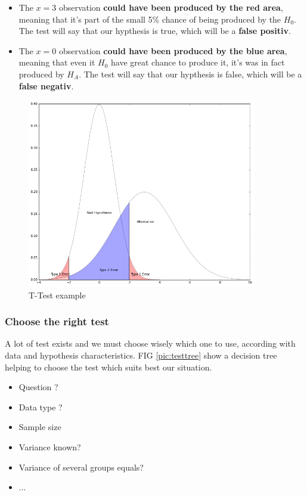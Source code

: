 \documentclass[a4paper,11pt,twoside]{article}
\begin{document}
\begin{itemize}
	\item The $x=3$ observation \textbf{could have been produced by the red area}, meaning that it's part of the small 5\% chance of being produced by the $H_0$. The test will say that our hypthesis is true, which will be a \textbf{false positiv}.

	\item The $x=0$ observation \textbf{could have been produced by the blue area}, meaning that even it $H_0$ have great chance to produce it, it's was in fact produced by $H_A$.  The test will say that our hypthesis is false, which will be a \textbf{false negativ}.
\end{itemize}

\begin{figure}[h]%
 \centering
 \includegraphics[width=10cm]{./pic/t-test}
 \caption{\label{pic:ttest} T-Test example}
\end{figure}

\subsubsection{Choose the right test}

A lot of test exists and we must choose wisely which one to use, according with data and hypothesis characteristics. FIG \ref{pic:testtree} show a decision tree helping to choose the test which suits best our situation.

\begin{itemize}
 \item Question ? 
 \item Data type ?
 \item Sample size
 \item Variance known? 
 \item Variance of several groups equals?
 \item ...
\end{itemize}
\end{document}
